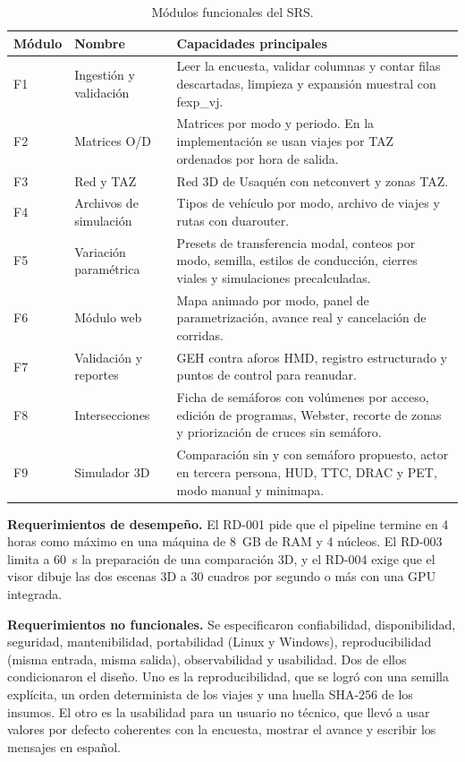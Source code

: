 \begin{table}[ht]
\renewcommand{\arraystretch}{1.15}
\centering
\small
\begin{tabular}{|p{1.6cm}|p{3.4cm}|p{9cm}|}
\hline
\textbf{Módulo} & \textbf{Nombre} & \textbf{Capacidades principales} \\ \hline
F1 & Ingestión y validación & Leer la encuesta, validar columnas y contar filas descartadas, limpieza y expansión muestral con fexp\_vj. \\ \hline
F2 & Matrices O/D & Matrices por modo y periodo. En la implementación se usan viajes por TAZ ordenados por hora de salida. \\ \hline
F3 & Red y TAZ & Red 3D de Usaquén con netconvert y zonas TAZ. \\ \hline
F4 & Archivos de simulación & Tipos de vehículo por modo, archivo de viajes y rutas con duarouter. \\ \hline
F5 & Variación paramétrica & Presets de transferencia modal, conteos por modo, semilla, estilos de conducción, cierres viales y simulaciones precalculadas. \\ \hline
F6 & Módulo web & Mapa animado por modo, panel de parametrización, avance real y cancelación de corridas. \\ \hline
F7 & Validación y reportes & GEH contra aforos HMD, registro estructurado y puntos de control para reanudar. \\ \hline
F8 & Intersecciones & Ficha de semáforos con volúmenes por acceso, edición de programas, Webster, recorte de zonas y priorización de cruces sin semáforo. \\ \hline
F9 & Simulador 3D & Comparación sin y con semáforo propuesto, actor en tercera persona, HUD, TTC, DRAC y PET, modo manual y minimapa. \\ \hline
\end{tabular}
\caption{Módulos funcionales del SRS.}
\label{tab:requerimientos}
\end{table}

\textbf{Requerimientos de desempeño.} El RD-001 pide que el pipeline termine en 4 horas como máximo en una máquina de 8~GB de RAM y 4 núcleos. El RD-003 limita a 60~s la preparación de una comparación 3D, y el RD-004 exige que el visor dibuje las dos escenas 3D a 30 cuadros por segundo o más con una GPU integrada.

\textbf{Requerimientos no funcionales.} Se especificaron confiabilidad, disponibilidad, seguridad, mantenibilidad, portabilidad (Linux y Windows), reproducibilidad (misma entrada, misma salida), observabilidad y usabilidad. Dos de ellos condicionaron el diseño. Uno es la reproducibilidad, que se logró con una semilla explícita, un orden determinista de los viajes y una huella SHA-256 de los insumos. El otro es la usabilidad para un usuario no técnico, que llevó a usar valores por defecto coherentes con la encuesta, mostrar el avance y escribir los mensajes en español.

